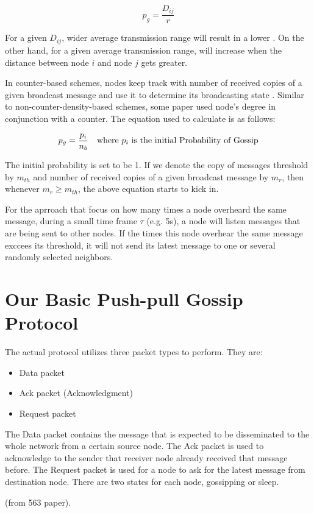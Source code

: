 \[ p_g = \frac{D_{ij}}{r}\]

For a given $D_{ij}$, wider average transmission range will result in a lower \emph{\pog}. On the other hand, for a given average transmission range, \emph{\pog} will increase when the distance between node $i$ and node $j$ gets greater.

In counter-based schemes, nodes keep track with number of received copies of a given broadcast message and use it to determine its broadcasting state \cite{2015survey}. Similar to non-counter-density-based schemes, some paper \cite{lee2010adaptive} used node's degree in conjunction with a counter. The equation used to calculate \emph{\pog} is as follows:

\[ p_g = \frac{p_i}{n_b} \quad \mbox{where } p_i \mbox{ is the initial Probability of Gossip}\]

The initial probability is set to be 1. If we denote the copy of messages threshold by $m_{th}$ and number of received copies of a given broadcast message by $m_r$, then whenever $m_r \geq m_{th}$, the above equation starts to kick in.


For the aprroach that focus on how many times a node overheard the same message, during a small time frame $\tau$ (e.g. 5s), a node will listen messages that are being sent to other nodes. If the times this node overhear the same message exccees its threshold, it will not send its latest message to one or several randomly selected neighbors. 

\section{Our Basic Push-pull Gossip Protocol}
The actual protocol utilizes three packet types to perform. They are:
\begin{itemize}
	\item Data packet
	\item Ack packet  (Acknowledgment)
	\item Request packet
\end{itemize}

The Data packet contains the message that is expected to be disseminated to the whole network from a certain source node. The Ack packet is used to acknowledge to the sender that receiver node already received that message before. The Request packet is used for a node to ask for the latest message from destination node. There are two states for each node, gossipping or sleep.


(from 563 paper).

